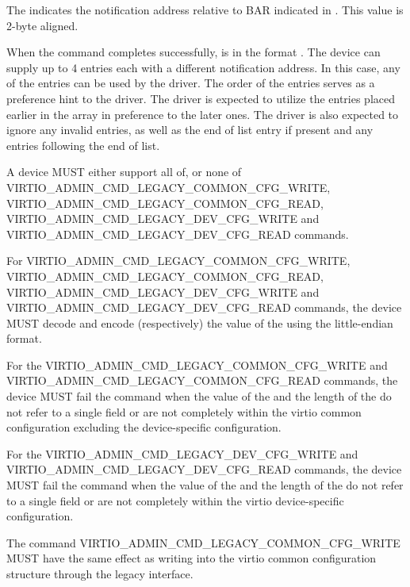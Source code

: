 The  indicates the notification address relative to BAR indicated
in . This value is 2-byte aligned.

When the command completes successfully,  is in
the format . The
device can supply up to 4 entries each with a different notification
address. In this case, any of the entries can be used by the driver. The order
of the entries serves as a preference hint to the driver. The driver is expected
to utilize the entries placed earlier in the array in preference to the later
ones. The driver is also expected to ignore any invalid entries, as well as
the end of list entry if present and any entries following the end of list.


A device MUST either support all of, or none of
VIRTIO_ADMIN_CMD_LEGACY_COMMON_CFG_WRITE,
VIRTIO_ADMIN_CMD_LEGACY_COMMON_CFG_READ,
VIRTIO_ADMIN_CMD_LEGACY_DEV_CFG_WRITE and
VIRTIO_ADMIN_CMD_LEGACY_DEV_CFG_READ commands.

For VIRTIO_ADMIN_CMD_LEGACY_COMMON_CFG_WRITE,
VIRTIO_ADMIN_CMD_LEGACY_COMMON_CFG_READ,
VIRTIO_ADMIN_CMD_LEGACY_DEV_CFG_WRITE and
VIRTIO_ADMIN_CMD_LEGACY_DEV_CFG_READ commands,
the device MUST decode and encode (respectively) the value of the
 using the little-endian format.

For the VIRTIO_ADMIN_CMD_LEGACY_COMMON_CFG_WRITE and
VIRTIO_ADMIN_CMD_LEGACY_COMMON_CFG_READ commands, 
the device MUST fail the command when the value of the
 and the length of the  do not refer to a
single field or are not completely within the virtio common configuration
excluding the device-specific configuration.

For the VIRTIO_ADMIN_CMD_LEGACY_DEV_CFG_WRITE and
VIRTIO_ADMIN_CMD_LEGACY_DEV_CFG_READ commands,
the device MUST fail the command when the value of the
 and the length of the  do not refer to a
single field or are not completely within the virtio device-specific
configuration.

The command VIRTIO_ADMIN_CMD_LEGACY_COMMON_CFG_WRITE MUST have the same effect
as writing into the virtio common configuration structure through the legacy
interface.


